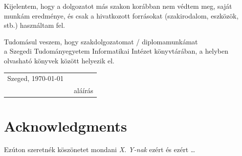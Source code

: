 \documentclass[12pt]{report}
\begin{document}
Kijelentem, hogy a dolgozatot más szakon korábban nem védtem meg, saját munkám eredménye, és csak a hivatkozott forrásokat (szakirodalom, eszközök, stb.) használtam fel.

Tudomásul veszem, hogy szakdolgozatomat / diplomamunkámat \\
a Szegedi Tudományegyetem Informatikai Intézet könyvtárában, a helyben olvasható könyvek között helyezik el.

\vspace*{2cm}

\begin{tabular}{lc}
	Szeged, \today\
	\hspace{2cm} & \makebox[6cm]{\dotfill} \\
	& aláírás \\
\end{tabular}

\vspace*{4cm}

\chapter*{Acknowledgments}

Ezúton szeretnék köszönetet mondani \textit{X. Y-nak} ezért és ezért \ldots

 

\end{document}
